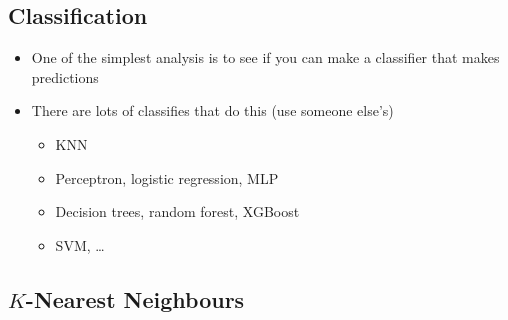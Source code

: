 \begin{slide}
\section{Classification}

\begin{PauseHighLight}
  \begin{itemize}
  \item One of the simplest analysis is to see if you can make a
    classifier that makes predictions\pause
  \item There are lots of classifies that do this (use someone else's)\pause
    \begin{itemize}\squeeze
    \item KNN
    \item Perceptron, logistic regression, MLP
    \item Decision trees, random forest, XGBoost
    \item SVM, \ldots\pause
    \end{itemize}
  \end{itemize}
\end{PauseHighLight}

\end{slide}



\begin{slide}
\section[-2]{$K$-Nearest Neighbours}
\pause
{}
\pb
\begin{center}
  \pause
\end{center}
\end{slide}



